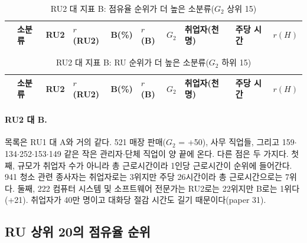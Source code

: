 \documentclass[11pt]{article}
\begin{document}
\begin{small}
\begin{longtable}{R{0.5cm}L{4.2cm}R{1.3cm}R{1.2cm}R{1.0cm}R{0.9cm}R{0.9cm}R{1.3cm}R{1.0cm}R{1.0cm}}
\caption{RU2 대 지표 B: 점유율 순위가 더 높은 소분류($G_2$ 상위 15)}\label{tab:g2pos}\\
\toprule
 & 소분류 & RU2 & $r$(RU2) & B(\%) & $r$(B) & $G_2$ & 취업자(천 명) & 주당 시간 & $r(H)$ \\
\midrule
\endfirsthead

\bottomrule
\end{longtable}

\begin{longtable}{R{0.5cm}L{4.2cm}R{1.3cm}R{1.2cm}R{1.0cm}R{0.9cm}R{0.9cm}R{1.3cm}R{1.0cm}R{1.0cm}}
\caption{RU2 대 지표 B: RU 순위가 더 높은 소분류($G_2$ 하위 15)}\label{tab:g2neg}\\
\toprule
 & 소분류 & RU2 & $r$(RU2) & B(\%) & $r$(B) & $G_2$ & 취업자(천 명) & 주당 시간 & $r(H)$ \\
\midrule
\endfirsthead

\bottomrule
\end{longtable}
\end{small}

\paragraph{RU2 대 B.} 목록은 RU1 대 A와 거의 같다. 521 매장 판매($G_2$ = +50), 사무 직업들, 그리고 159$\cdot$134$\cdot$252$\cdot$153$\cdot$149 같은 작은 관리자$\cdot$단체 직업이 양 끝에 온다. 다른 점은 두 가지다. 첫째, 규모가 취업자 수가 아니라 총 근로시간이라 1인당 근로시간이 순위에 들어간다. 941 청소 관련 종사자는 취업자로는 3위지만 주당 26시간이라 총 근로시간으로는 7위다. 둘째, 222 컴퓨터 시스템 및 소프트웨어 전문가는 RU2로는 22위지만 B로는 1위다(+21). 취업자가 40만 명이고 대화당 절감 시간도 길기 때문이다(paper 31).

\subsection{RU 상위 20의 점유율 순위}
\end{document}
